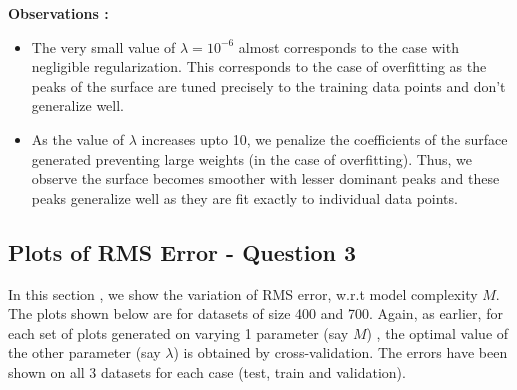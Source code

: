 \documentclass{article}
\begin{document}
\textbf{Observations :}

\begin{itemize}
\item The very small value of $\lambda=10^{-6}$ almost corresponds to the case with negligible regularization. This corresponds to the case of overfitting as the peaks of the surface are tuned precisely to the training data points and don't generalize well.
\item As the value of $\lambda$ increases upto 10, we penalize the coefficients of the surface generated preventing large weights (in the case of overfitting). Thus, we observe the surface becomes smoother with lesser dominant peaks and these peaks generalize well as they are fit exactly to individual data points.
\end{itemize}


\subsection{Plots of RMS Error - Question 3}

In this section , we show the variation of RMS error, w.r.t model complexity $M$. The plots shown below are for datasets of size 400 and 700.
Again, as earlier, for each set of plots generated on varying 1 parameter (say $M$) , the optimal value of the other parameter (say $\lambda$) is obtained by cross-validation. 
The errors have been shown on all 3 datasets for each case (test, train and validation). 
\end{document}
